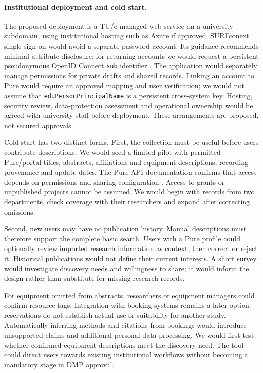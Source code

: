 \documentclass[11pt,a4paper]{article}
\begin{document}
\paragraph{Institutional deployment and cold start.}
The proposed deployment is a TU/e-managed web service on a university subdomain, using institutional hosting such as Azure if approved. SURFconext single sign-on would avoid a separate password account. Its guidance recommends minimal attribute disclosure; for returning accounts we would request a persistent pseudonymous OpenID Connect \texttt{sub} identifier \citep{surfattributes}. The application would separately manage permissions for private drafts and shared records. Linking an account to Pure would require an approved mapping and user verification; we would not assume that \texttt{eduPersonPrincipalName} is a persistent cross-system key. Hosting, security review, data-protection assessment and operational ownership would be agreed with university staff before deployment. These arrangements are proposed, not secured approvals.

Cold start has two distinct forms. First, the collection must be useful before users contribute descriptions. We would seed a limited pilot with permitted Pure/portal titles, abstracts, affiliations and equipment descriptions, recording provenance and update dates. The Pure API documentation confirms that access depends on permissions and sharing configuration \citep{pureapi}. Access to grants or unpublished projects cannot be assumed. We would begin with records from two departments, check coverage with their researchers and expand after correcting omissions.

Second, new users may have no publication history. Manual descriptions must therefore support the complete basic search. Users with a Pure profile could optionally review imported research information as context, then correct or reject it. Historical publications would not define their current interests. A short survey would investigate discovery needs and willingness to share; it would inform the design rather than substitute for missing research records.

For equipment omitted from abstracts, researchers or equipment managers could confirm resource tags. Integration with booking systems remains a later option: reservations do not establish actual use or suitability for another study. Automatically inferring methods and citations from bookings would introduce unsupported claims and additional personal-data processing. We would first test whether confirmed equipment descriptions meet the discovery need. The tool could direct users towards existing institutional workflows without becoming a mandatory stage in DMP approval.
\end{document}
